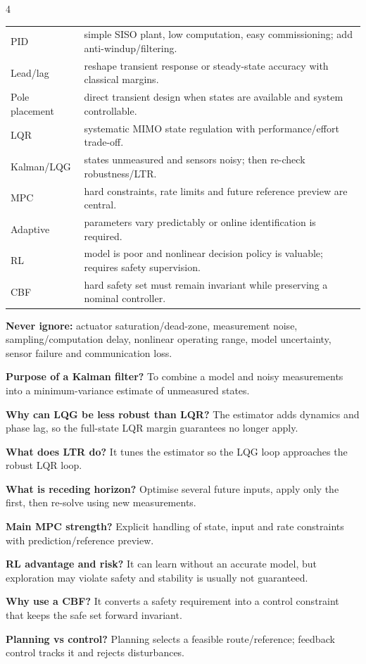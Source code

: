\documentclass[a4paper,8pt]{extarticle}
\newcommand{\topicdot}[1]{\tikz[baseline=-0.48ex]\fill[#1] (0,0) circle (0.64ex);}
\newcommand{\Edot}{\topicdot{examDot}}
\newcommand{\mybox}[2]{
\begin{tcolorbox}[
  enhanced,
  colback=lightblue!4!white,
  colframe=lightblue!76!black,
  colbacktitle=lightblue!49!white,
  boxrule=0.25pt,
  boxsep=0.25pt,
  left=0.75pt,right=0.75pt,top=0.55pt,bottom=0.55pt,
  toptitle=0.35pt,bottomtitle=0.25pt,
  arc=0.45pt,outer arc=0.45pt,
  title={\fontsize{4.85pt}{5.05pt}\selectfont\textbf{#1}},
  fonttitle=\bfseries,
  coltitle=black,
  before skip=0.55pt,after skip=0.55pt,
  fontupper=\fontsize{4.15pt}{4.52pt}\selectfont\RaggedRight
]
#2
\end{tcolorbox}}
\newcommand{\qrow}[2]{%
\textbf{#1} #2\par}
\newcommand{\tinyhead}[1]{\textbf{#1}\;}
\begin{document}
\begin{multicols}{4}
\mybox{Method Selection --- One-Line Justifications \Edot}{
\begin{tabularx}{\linewidth}{@{}lX@{}}
PID & simple SISO plant, low computation, easy commissioning; add anti-windup/filtering.\\
Lead/lag & reshape transient response or steady-state accuracy with classical margins.\\
Pole placement & direct transient design when states are available and system controllable.\\
LQR & systematic MIMO state regulation with performance/effort trade-off.\\
Kalman/LQG & states unmeasured and sensors noisy; then re-check robustness/LTR.\\
MPC & hard constraints, rate limits and future reference preview are central.\\
Adaptive & parameters vary predictably or online identification is required.\\
RL & model is poor and nonlinear decision policy is valuable; requires safety supervision.\\
CBF & hard safety set must remain invariant while preserving a nominal controller.\\
\end{tabularx}
\tinyhead{Never ignore:} actuator saturation/dead-zone, measurement noise, sampling/computation delay, nonlinear operating range, model uncertainty, sensor failure and communication loss.
}


\mybox{Week 3 High-Probability Answers \Edot}{
\qrow{Purpose of a Kalman filter?}{To combine a model and noisy measurements into a minimum-variance estimate of unmeasured states.}
\qrow{Why can LQG be less robust than LQR?}{The estimator adds dynamics and phase lag, so the full-state LQR margin guarantees no longer apply.}
\qrow{What does LTR do?}{It tunes the estimator so the LQG loop approaches the robust LQR loop.}
\qrow{What is receding horizon?}{Optimise several future inputs, apply only the first, then re-solve using new measurements.}
\qrow{Main MPC strength?}{Explicit handling of state, input and rate constraints with prediction/reference preview.}
\qrow{RL advantage and risk?}{It can learn without an accurate model, but exploration may violate safety and stability is usually not guaranteed.}
\qrow{Why use a CBF?}{It converts a safety requirement into a control constraint that keeps the safe set forward invariant.}
\qrow{Planning vs control?}{Planning selects a feasible route/reference; feedback control tracks it and rejects disturbances.}
}

\end{multicols}
\end{document}
